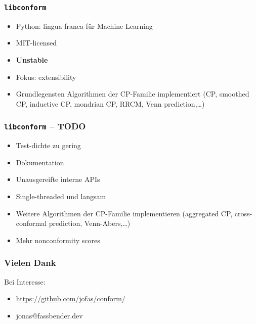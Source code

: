 \documentclass{beamer}
\def\libconform{\texttt{libconform}}
\begin{document}
\begin{frame}
  \frametitle{\libconform}
  \pause
  \begin{itemize}[<+->]
    \item Python: lingua franca f\"ur Machine Learning

    \item MIT-licensed

    \item \textbf{Unstable}

    \item Fokus: extensibility

    \item Grundlegensten Algorithmen der CP-Familie
          implementiert (CP, smoothed CP, inductive CP,
          mondrian CP, RRCM, Venn prediction,\dots)

  \end{itemize}
\end{frame}

\begin{frame}
  \frametitle{\libconform{} -- TODO}
  \pause
  \begin{itemize}[<+->]
    \item Test-dichte zu gering

    \item Dokumentation

    \item Unausgereifte interne APIs

    \item Single-threaded und langsam

    \item Weitere Algorithmen der CP-Familie implementieren
          (aggregated CP, cross-conformal prediction,
          Venn-Abers,\dots)

    \item Mehr nonconformity scores

  \end{itemize}
\end{frame}

\begin{frame}
  \frametitle{Vielen Dank}
  Bei Interesse:
  \begin{itemize}
    \item \url{https://github.com/jofas/conform/}
    \item jonas@fassbender.dev
  \end{itemize}
\end{frame}
\end{document}
